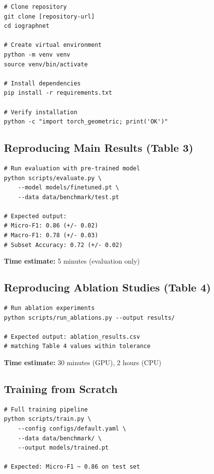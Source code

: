 \begin{verbatim}
# Clone repository
git clone [repository-url]
cd iographnet

# Create virtual environment
python -m venv venv
source venv/bin/activate

# Install dependencies
pip install -r requirements.txt

# Verify installation
python -c "import torch_geometric; print('OK')"
\end{verbatim}

\subsection{Reproducing Main Results (Table 3)}

\begin{verbatim}
# Run evaluation with pre-trained model
python scripts/evaluate.py \
    --model models/finetuned.pt \
    --data data/benchmark/test.pt

# Expected output:
# Micro-F1: 0.86 (+/- 0.02)
# Macro-F1: 0.78 (+/- 0.03)
# Subset Accuracy: 0.72 (+/- 0.02)
\end{verbatim}

\textbf{Time estimate:} 5 minutes (evaluation only)

\subsection{Reproducing Ablation Studies (Table 4)}

\begin{verbatim}
# Run ablation experiments
python scripts/run_ablations.py --output results/

# Expected output: ablation_results.csv
# matching Table 4 values within tolerance
\end{verbatim}

\textbf{Time estimate:} 30 minutes (GPU), 2 hours (CPU)

\subsection{Training from Scratch}

\begin{verbatim}
# Full training pipeline
python scripts/train.py \
    --config configs/default.yaml \
    --data data/benchmark/ \
    --output models/trained.pt

# Expected: Micro-F1 ~ 0.86 on test set
\end{verbatim}

